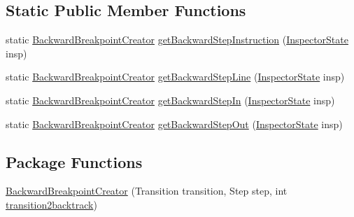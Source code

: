 \subsection*{Static Public Member Functions}
\begin{DoxyCompactItemize}
\item 
static \hyperlink{classgov_1_1nasa_1_1jpf_1_1inspector_1_1server_1_1pathanalysis_1_1_backward_breakpoint_creator}{Backward\+Breakpoint\+Creator} \hyperlink{classgov_1_1nasa_1_1jpf_1_1inspector_1_1server_1_1pathanalysis_1_1_backward_breakpoint_creator_ac3741d521378ea303a56d1c0880401d8}{get\+Backward\+Step\+Instruction} (\hyperlink{interfacegov_1_1nasa_1_1jpf_1_1inspector_1_1server_1_1expression_1_1_inspector_state}{Inspector\+State} insp)
\item 
static \hyperlink{classgov_1_1nasa_1_1jpf_1_1inspector_1_1server_1_1pathanalysis_1_1_backward_breakpoint_creator}{Backward\+Breakpoint\+Creator} \hyperlink{classgov_1_1nasa_1_1jpf_1_1inspector_1_1server_1_1pathanalysis_1_1_backward_breakpoint_creator_a762a4760a8d5100051cd1194983ae245}{get\+Backward\+Step\+Line} (\hyperlink{interfacegov_1_1nasa_1_1jpf_1_1inspector_1_1server_1_1expression_1_1_inspector_state}{Inspector\+State} insp)
\item 
static \hyperlink{classgov_1_1nasa_1_1jpf_1_1inspector_1_1server_1_1pathanalysis_1_1_backward_breakpoint_creator}{Backward\+Breakpoint\+Creator} \hyperlink{classgov_1_1nasa_1_1jpf_1_1inspector_1_1server_1_1pathanalysis_1_1_backward_breakpoint_creator_ab48fc22b85c51024eeccc5c15d505b31}{get\+Backward\+Step\+In} (\hyperlink{interfacegov_1_1nasa_1_1jpf_1_1inspector_1_1server_1_1expression_1_1_inspector_state}{Inspector\+State} insp)
\item 
static \hyperlink{classgov_1_1nasa_1_1jpf_1_1inspector_1_1server_1_1pathanalysis_1_1_backward_breakpoint_creator}{Backward\+Breakpoint\+Creator} \hyperlink{classgov_1_1nasa_1_1jpf_1_1inspector_1_1server_1_1pathanalysis_1_1_backward_breakpoint_creator_a49e5ea8ea4979928d20a45d31397faac}{get\+Backward\+Step\+Out} (\hyperlink{interfacegov_1_1nasa_1_1jpf_1_1inspector_1_1server_1_1expression_1_1_inspector_state}{Inspector\+State} insp)
\end{DoxyCompactItemize}
\subsection*{Package Functions}
\begin{DoxyCompactItemize}
\item 
\hyperlink{classgov_1_1nasa_1_1jpf_1_1inspector_1_1server_1_1pathanalysis_1_1_backward_breakpoint_creator_ab7493637884e06f11642dbe8234e7c39}{Backward\+Breakpoint\+Creator} (Transition transition, Step step, int \hyperlink{classgov_1_1nasa_1_1jpf_1_1inspector_1_1server_1_1pathanalysis_1_1_backward_breakpoint_creator_a87651f019518dc70a7a7e0439b3f9ae1}{transition2backtrack})
\end{DoxyCompactItemize}
